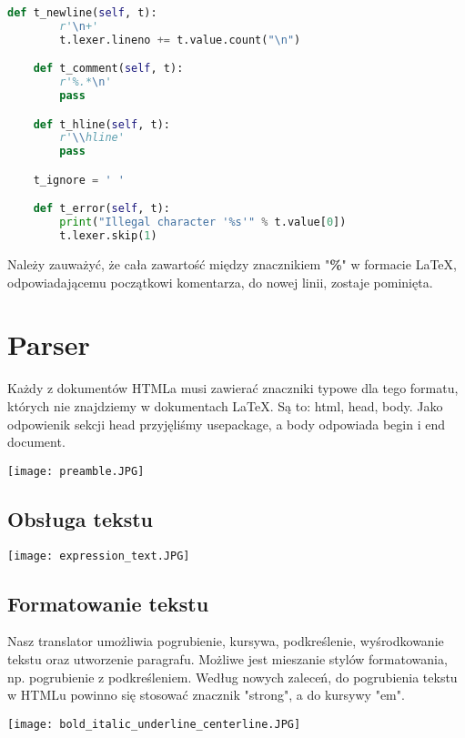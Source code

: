 \begin{lstlisting}[language={Python}, caption={Analiza leksykalna - pozostałe tokeny}, label={analiza-leksykalna-pozostale}]
    def t_newline(self, t):
        r'\n+'
        t.lexer.lineno += t.value.count("\n")

    def t_comment(self, t):
        r'%.*\n'
        pass

    def t_hline(self, t):
        r'\\hline'
        pass

    t_ignore = ' '

    def t_error(self, t):
        print("Illegal character '%s'" % t.value[0])
        t.lexer.skip(1)
\end{lstlisting}


Należy zauważyć, że cała zawartość między znacznikiem "\textbf{\%}" w formacie \LaTeX, odpowiadającemu początkowi komentarza, do nowej linii, 
zostaje pominięta.

\section{Parser}

Każdy z dokumentów HTMLa musi zawierać znaczniki typowe dla tego formatu, których nie znajdziemy w dokumentach LaTeX. Są to: html,
head, body. Jako odpowienik sekcji head przyjęliśmy usepackage, a body odpowiada begin i end document.

\texttt{[image: preamble.JPG]}

\subsection{Obsługa tekstu}

\texttt{[image: expression\_text.JPG]}

\subsection{Formatowanie tekstu}

Nasz translator umożliwia pogrubienie, kursywa, podkreślenie, wyśrodkowanie tekstu oraz utworzenie paragrafu. Możliwe jest mieszanie
stylów formatowania, np. pogrubienie z podkreśleniem. Według nowych zaleceń, do pogrubienia tekstu w HTMLu powinno się stosować znacznik
"strong", a do kursywy "em".

\texttt{[image: bold\_italic\_underline\_centerline.JPG]}

